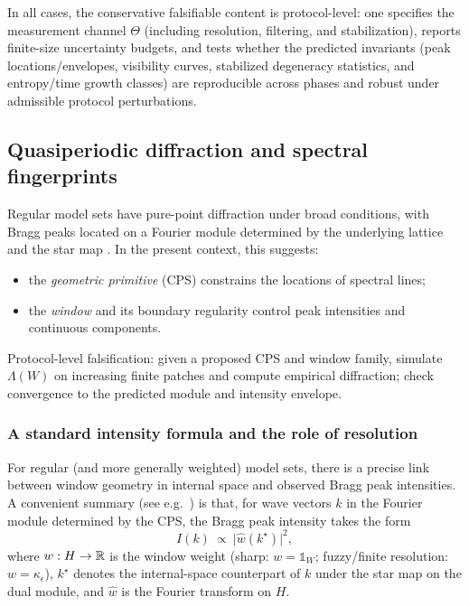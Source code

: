 In all cases, the conservative falsifiable content is protocol-level: one specifies the measurement channel $\Theta$ (including resolution, filtering, and stabilization), reports finite-size uncertainty budgets, and tests whether the predicted invariants (peak locations/envelopes, visibility curves, stabilized degeneracy statistics, and entropy/time growth classes) are reproducible across phases and robust under admissible protocol perturbations.

\subsection{Quasiperiodic diffraction and spectral fingerprints}\label{sec:falsifiability:diffraction}

Regular model sets have pure-point diffraction under broad conditions, with Bragg peaks located on a Fourier module determined by the underlying lattice and the star map \cite{Hof1995,BaakeGrimm2013}. In the present context, this suggests:
\begin{itemize}[leftmargin=*,itemsep=2pt]
  \item the \emph{geometric primitive} (CPS) constrains the locations of spectral lines;
  \item the \emph{window} and its boundary regularity control peak intensities and continuous components.
\end{itemize}
Protocol-level falsification: given a proposed CPS and window family, simulate $\Lambda(W)$ on increasing finite patches and compute empirical diffraction; check convergence to the predicted module and intensity envelope.

\subsubsection{A standard intensity formula and the role of resolution}\label{sec:falsifiability:diffraction-formula}

For regular (and more generally weighted) model sets, there is a precise link between window geometry in internal space and observed Bragg peak intensities. A convenient summary (see e.g.\ \cite{Hof1995,BaakeGrimm2013}) is that, for wave vectors $k$ in the Fourier module determined by the CPS, the Bragg peak intensity takes the form
\[
I(k)\ \propto\ \bigl|\widehat{w}(k^\star)\bigr|^2,
\]
where $w:H\to\mathbb{R}$ is the window weight (sharp: $w=\mathds{1}_W$; fuzzy/finite resolution: $w=\kappa_\epsilon$), $k^\star$ denotes the internal-space counterpart of $k$ under the star map on the dual module, and $\widehat{w}$ is the Fourier transform on $H$.

